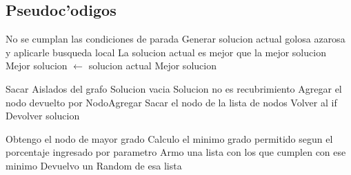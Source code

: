 \subsection{Pseudoc'odigos}

\begin{algorithmic}[1]
\WHILE No se cumplan las condiciones de parada
	\STATE Generar solucion actual golosa azarosa y aplicarle busqueda local
	\IF La solucion actual es mejor que la mejor solucion
		Mejor solucion $\leftarrow$ solucion actual 
	\ENDIF
\ENDWHILE
\RETURN Mejor solucion
\end{algorithmic}

\vspace{2em}

\begin{algorithm}
\STATE Sacar Aislados del grafo
\STATE Solucion \leftarrow vacia
\IF Solucion no es recubrimiento
	\STATE Agregar el nodo devuelto por NodoAgregar
	\STATE Sacar el nodo de la lista de nodos
	\STATE Volver al if
\ELSE
	\STATE Devolver solucion
\ENDIF
\end{algorithm}
	
\vspace{2em}
	
\begin{algorithm}
\STATE Obtengo el nodo de mayor grado
\STATE Calculo el minimo grado permitido segun el porcentaje ingresado por parametro
\STATE Armo una lista con los que cumplen con ese minimo
\STATE Devuelvo un Random de esa lista
\end{algorithm}
